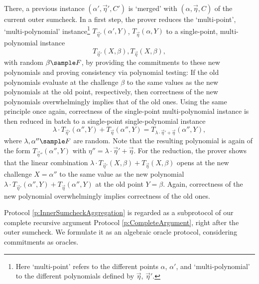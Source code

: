 \documentclass[10pt,article,oneside]{memoir}
\theoremstyle{definition}
\theoremstyle{remark}
\begin{document}
There, a previous instance $(\alpha',\vec\eta',C')$ is `merged' with  $(\alpha,\vec\eta,C)$ of the current outer sumcheck.
In a first step, the prover reduces the  `multi-point', `multi-polynomial' instance\footnote{%
Here `multi-point' refers to the different points $\alpha$, $\alpha'$, and `multi-polynomial' to the different polynomials defined by $\vec\eta$, $\vec\eta'$.
}
$T_{\vec\eta'}(\alpha',Y)$, $T_{\vec\eta}(\alpha,Y)$ to a single-point, multi-polynomial instance 
\[
T_{\vec\eta'}(X,\beta), T_{\vec\eta}(X,\beta),
\] 
with random $\beta\sample F$, by providing the commitments to these new  polynomials and proving consistency via polynomial testing:
If the old polynomials evaluate at the challenge $\beta$ to the same values as the new polynomials at the old point, respectively, then correctness of the new polynomials overwhelmingly implies that of the old ones.
Using the same principle once again, correctness of the single-point multi-polynomial instance is then reduced in batch to a single-point single-polynomial instance 
\[
\lambda\cdot T_{\vec\eta'}(\alpha'',Y) + T_{\vec\eta}(\alpha'',Y) = T_{\lambda\cdot\vec\eta' + \vec\eta}(\alpha'',Y),
\] 
where $\lambda,\alpha''\sample F$ are random.
Note that the resulting polynomial is again of the form $T_{\vec\eta''}(\alpha'',Y)$ with $\eta''=\lambda\cdot\vec\eta' + \vec\eta$.
For the reduction, the prover shows that the linear combination $\lambda\cdot T_{\vec\eta'}(X,\beta) + T_{\vec\eta}(X,\beta)$ opens at the new challenge $X=\alpha''$ to the same value as the new polynomial  $\lambda\cdot T_{\vec\eta'}(\alpha'',Y) + T_{\vec\eta}(\alpha'',Y)$ at the old point $Y=\beta$.
Again, correctness of the new polynomial overwhelmingly implies correctness of the old ones.

Protocol \ref{p:InnerSumcheckAggregation} is regarded as a subprotocol of our complete recursive argument Protocol \ref{p:CompleteArgument}, right after the outer sumcheck.
We formulate it as an algebraic oracle protocol, considering commitments as oracles. 
\end{document}
